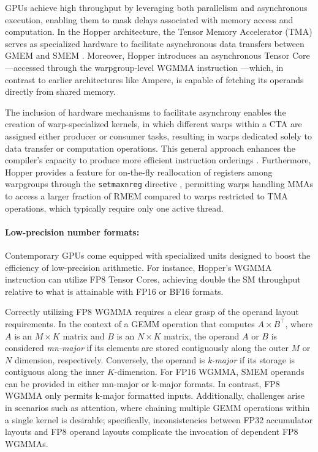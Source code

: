 \begin{enumerate}
GPUs achieve high throughput by leveraging both parallelism and asynchronous execution, enabling them to mask delays associated with memory access and computation. In the Hopper architecture, the Tensor Memory Accelerator (TMA) serves as specialized hardware to facilitate asynchronous data transfers between GMEM and SMEM \cite[\S7.29]{cuda}. Moreover, Hopper introduces an asynchronous Tensor Core—accessed through the warpgroup-level WGMMA instruction \cite[\S9.7.14]{ptx}—which, in contrast to earlier architectures like Ampere, is capable of fetching its operands directly from shared memory.

The inclusion of hardware mechanisms to facilitate asynchrony enables the creation of warp-specialized kernels, in which different warps within a CTA are assigned either producer or consumer tasks, resulting in warps dedicated solely to data transfer or computation operations. This general approach enhances the compiler's capacity to produce more efficient instruction orderings \citep{warp-specialization-2011}. Furthermore, Hopper provides a feature for on-the-fly reallocation of registers among warpgroups through the \verb|setmaxnreg| directive \cite[\S9.7.17.1]{ptx}, permitting warps handling MMAs to access a larger fraction of RMEM compared to warps restricted to TMA operations, which typically require only one active thread.

\paragraph{Low-precision number formats:}
\label{sec:low-precision-gpu}
Contemporary GPUs come equipped with specialized units designed to boost the efficiency of low-precision arithmetic. For instance, Hopper’s WGMMA instruction can utilize FP8 Tensor Cores, achieving double the SM throughput relative to what is attainable with FP16 or BF16 formats.

Correctly utilizing FP8 WGMMA requires a clear grasp of the operand layout requirements. In the context of a GEMM operation that computes $A \times B^{\top}$, where $A$ is an $M\times K$ matrix and $B$ is an $N\times K$ matrix, the operand $A$ or $B$ is considered \emph{mn-major} if its elements are stored contiguously along the outer $M$ or $N$ dimension, respectively. Conversely, the operand is \emph{k-major} if its storage is contiguous along the inner $K$-dimension. For FP16 WGMMA, SMEM operands can be provided in either mn-major or k-major formats. In contrast, FP8 WGMMA only permits k-major formatted inputs. Additionally, challenges arise in scenarios such as attention, where chaining multiple GEMM operations within a single kernel is desirable; specifically, inconsistencies between FP32 accumulator layouts and FP8 operand layouts complicate the invocation of dependent FP8 WGMMAs.


\end{enumerate}
